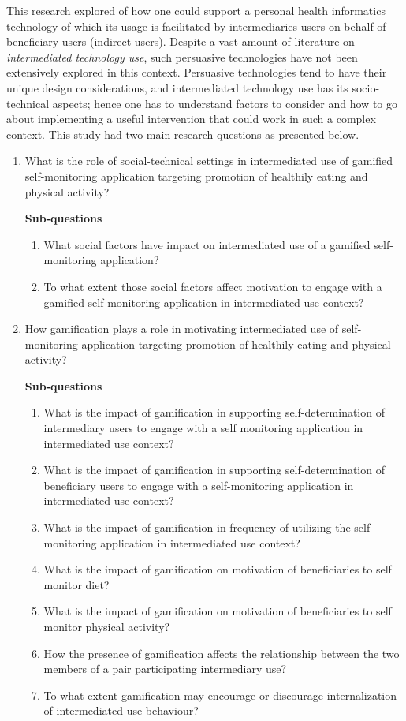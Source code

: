 This research explored of how one could support a personal health informatics technology of which its usage is facilitated by intermediaries users on behalf of beneficiary users (indirect users). Despite a vast amount of literature on \emph{intermediated technology use}, such persuasive technologies have not been extensively explored in this context. Persuasive technologies tend to have their unique design considerations, and intermediated technology use has its socio-technical aspects; hence one has to understand factors to consider and how to go about implementing a useful intervention that could work in such a complex context. This study had two main research questions as presented below.
\begin{enumerate}
\item What is the role of social-technical settings in intermediated use of gamified self-monitoring application targeting promotion of healthily eating and physical activity?

\textbf{Sub-questions}
\begin{enumerate}[label=\alph*.]
\item What social factors have impact on intermediated use of a gamified self-monitoring application?
\item To what extent those social factors affect motivation to engage with a gamified self-monitoring application in intermediated use context?
\end{enumerate}
\item How gamification plays a role in motivating intermediated use of self-monitoring application targeting promotion of healthily eating and physical activity?

\textbf{Sub-questions}
\begin{enumerate}[label=\alph*.]
\item What is the impact of gamification in supporting self-determination of intermediary users to engage with a self monitoring application in intermediated use context?
\item What is the impact of gamification in supporting self-determination of beneficiary users to engage with a self-monitoring application in intermediated use context?
\item What is the impact of gamification in frequency of utilizing the self-monitoring application in intermediated use context?
\item What is the impact of gamification on motivation of beneficiaries to self monitor diet?
\item What is the impact of gamification on motivation of beneficiaries to self monitor physical activity?
\item How the presence of gamification affects the relationship between the two members of a pair participating intermediary use?
\item To what extent gamification may encourage or discourage internalization of intermediated use behaviour?
\end{enumerate}
\end{enumerate}  
